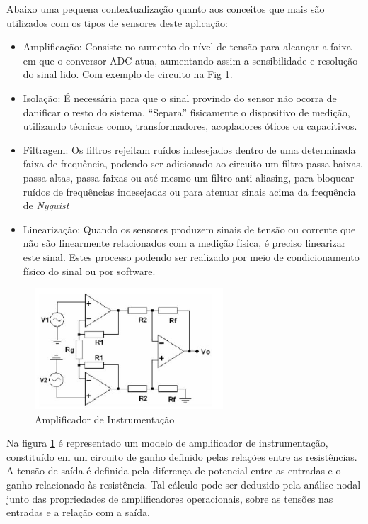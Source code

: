 Abaixo uma pequena contextualização quanto aos conceitos que mais são utilizados com os tipos de sensores deste aplicação:

\begin{itemize}
	\item Amplificação: Consiste no aumento do nível de tensão para alcançar a faixa em que o conversor ADC atua, aumentando assim a sensibilidade e resolução do sinal lido. Com exemplo de circuito na Fig \ref{amplificadorDeInstrumentacao}.
	\item Isolação: É necessária para que o sinal provindo do sensor não ocorra de danificar o resto do sistema. “Separa” fisicamente o dispositivo de medição, utilizando técnicas como, transformadores, acopladores óticos ou capacitivos.
	\item Filtragem: Os filtros rejeitam ruídos indesejados dentro de uma determinada faixa de frequência, podendo ser adicionado ao circuito um filtro passa-baixas, passa-altas, passa-faixas ou até mesmo um filtro anti-aliasing, para bloquear ruídos de frequências indesejadas ou para atenuar sinais acima da frequência de \textit{Nyquist}
	\item Linearização: Quando os sensores produzem sinais de tensão ou corrente que não são linearmente relacionados com a medição física, é preciso linearizar este sinal. Estes processo podendo ser realizado por meio de condicionamento físico do sinal ou por software.
\end{itemize}

\begin{figure}[h!]
	\centering
	\includegraphics[keepaspectratio=true,scale= 0.7]{figuras/Amplificador.PNG}
	\caption{Amplificador de Instrumentação \cite{SMAR}}
	\label{amplificadorDeInstrumentacao}
\end{figure}

Na figura \ref{amplificadorDeInstrumentacao} é representado um modelo de amplificador de instrumentação, constituído em um circuito de ganho definido pelas relações entre as resistências. A tensão de saída é definida pela diferença de potencial entre as entradas e o ganho relacionado às resistência. Tal cálculo pode ser deduzido pela análise nodal junto das propriedades de amplificadores operacionais, sobre as tensões nas entradas e a relação com a saída.

